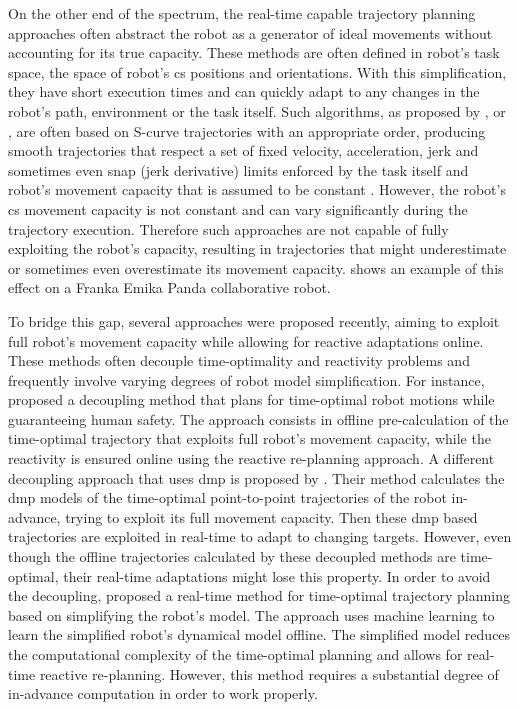 On the other end of the spectrum, the real-time capable trajectory planning approaches often abstract the robot as a generator of ideal movements without accounting for its true capacity. These methods are often defined in robot's task space, the space of robot's \gls{cs} positions and orientations. With this simplification, they have short execution times and can quickly adapt to any changes in the robot's path, environment or the task itself. Such algorithms, as proposed by \citet{Macfarlane2003}, \citet{haschke2008line} or \citet{Svarny2022}, are often based on S-curve trajectories \cite{FANG2019} with an appropriate order, producing smooth trajectories that respect a set of fixed velocity, acceleration, jerk and sometimes even snap (jerk derivative) limits enforced by the task itself and robot's movement capacity that is assumed to be constant \cite{modernrobotics}. However, the robot's \gls{cs} movement capacity is not constant and can vary significantly during the trajectory execution. Therefore such approaches are not capable of fully exploiting the robot's capacity, resulting in trajectories that might underestimate or sometimes even overestimate its movement capacity.  shows an example of this effect on a Franka Emika Panda collaborative robot.


To bridge this gap, several approaches were proposed recently, aiming to exploit full robot's movement capacity while allowing for reactive adaptations online. These methods often decouple time-optimality and reactivity problems and frequently involve varying degrees of robot model simplification.
For instance, \citet{Palleschi2021} proposed a decoupling method that plans for time-optimal robot motions while guaranteeing human safety. The approach consists in offline pre-calculation of the time-optimal trajectory that exploits full robot's movement capacity, while the reactivity is ensured online using the reactive re-planning approach. 
A different decoupling approach that uses \gls{dmp} is proposed by \citet{dmp2014}. Their method calculates the \gls{dmp} models of the time-optimal point-to-point trajectories of the robot in-advance, trying to exploit its full movement capacity. Then these \gls{dmp} based trajectories are exploited in real-time to adapt to changing targets. However, even though the offline trajectories calculated by these decoupled methods are time-optimal, their real-time adaptations might lose this property. 
In order to avoid the decoupling, \citet{ZHANG2020} proposed a real-time method for time-optimal trajectory planning based on simplifying the robot's model. The approach uses machine learning to learn the simplified robot's dynamical model offline. The simplified model reduces the computational complexity of the time-optimal planning and allows for real-time reactive re-planning. However, this method requires a substantial degree of in-advance computation in order to work properly. 


